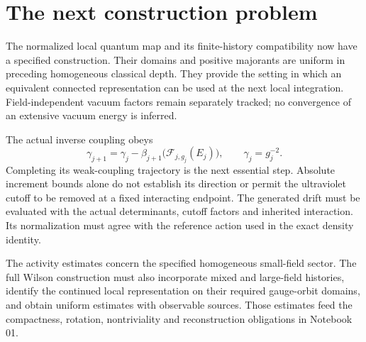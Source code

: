 \section{The next construction problem}
\label{qdn-next-section}

The normalized local quantum map and its finite-history compatibility
now have a specified construction. Their domains and positive
majorants are uniform in preceding homogeneous classical depth.
They provide the setting in which an equivalent connected
representation can be used at the next local integration.
Field-independent vacuum factors remain separately tracked;
no convergence of an extensive vacuum energy is inferred.

The actual inverse coupling obeys
\[
 \gamma_{j+1}=\gamma_j-
       \beta_{j+1}\bigl(\mathcal F_{j,g_j}(E_j)\bigr),
 \qquad \gamma_j=g_j^{-2}.
\]
Completing its weak-coupling trajectory is the next essential
step. Absolute increment bounds alone do not establish its
direction or permit the ultraviolet cutoff to be removed at a
fixed interacting endpoint. The generated drift must be evaluated
with the actual determinants, cutoff factors and inherited
interaction. Its normalization must agree with the reference
action used in the exact density identity.

The activity estimates concern the specified homogeneous
small-field sector. The full Wilson construction must also
incorporate mixed and large-field histories, identify the
continued local representation on their required gauge-orbit
domains, and obtain uniform estimates with observable sources.
Those estimates feed the compactness, rotation, nontriviality
and reconstruction obligations in Notebook 01.

